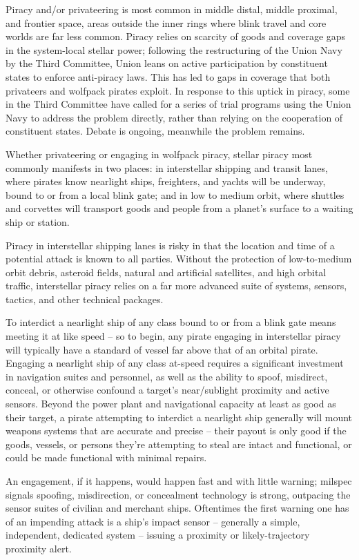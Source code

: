 Piracy and/or privateering is most common in middle distal, middle proximal, and frontier space,
areas outside the inner rings where blink travel and core worlds are far less common. Piracy
relies on scarcity of goods and coverage gaps in the system-local stellar power;
following the restructuring of the Union Navy by the Third Committee, Union leans on active
participation by constituent states to enforce anti-piracy laws. This has led to gaps in coverage
that both privateers and wolfpack pirates exploit. In response to this uptick in piracy, some in the
Third Committee have called for a series of trial programs using the Union Navy to address the
problem directly, rather than relying on the cooperation of constituent states. Debate is ongoing,
meanwhile the problem remains.

Whether privateering or engaging in wolfpack piracy, stellar piracy most commonly manifests in
two places: in interstellar shipping and transit lanes, where pirates know nearlight ships,
freighters, and yachts will be underway, bound to or from a local blink gate; and in low to
medium orbit, where shuttles and corvettes will transport goods and people from a planet's
surface to a waiting ship or station.

Piracy in interstellar shipping lanes is risky in that the location and time of a potential attack is
known to all parties. Without the protection of low-to-medium orbit debris, asteroid fields, natural
and artificial satellites, and high orbital traffic, interstellar piracy relies on a far more advanced
suite of systems, sensors, tactics, and other technical packages.

To interdict a nearlight ship of any class bound to or from a blink gate means meeting it at like
speed -- so to begin, any pirate engaging in interstellar piracy will typically have a standard of
vessel far above that of an orbital pirate. Engaging a nearlight ship of any class at-speed requires
a significant investment in navigation suites and personnel, as well as the ability to spoof,
misdirect, conceal, or otherwise confound a target's near/sublight proximity and active sensors.
Beyond the power plant and navigational capacity at least as good as their target, a pirate
attempting to interdict a nearlight ship generally will mount weapons systems that are accurate
and precise -- their payout is only good if the goods, vessels, or persons they're attempting to
steal are intact and functional, or could be made functional with minimal repairs.

An engagement, if it happens, would happen fast and with little warning; milspec signals
spoofing, misdirection, or concealment technology is strong, outpacing the sensor suites of
civilian and merchant ships. Oftentimes the first warning one has of an impending attack is a
ship's impact sensor -- generally a simple, independent, dedicated system -- issuing a proximity
or likely-trajectory proximity alert.

